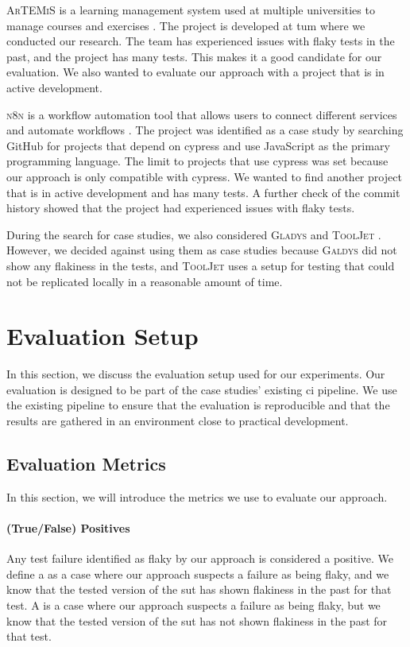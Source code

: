 \textsc{ArTEMiS} is a learning management system used at multiple universities to manage courses and exercises \autocite{krusche_artemis_2018}.
The project is developed at \ac{tum} where we conducted our research.
The team has experienced issues with flaky tests in the past, and the project has many tests.
This makes it a good candidate for our evaluation.
We also wanted to evaluate our approach with a project that is in active development.

\textsc{n8n} is a workflow automation tool that allows users to connect different services and automate workflows \autocite{noauthor_n8n_2023}.
The project was identified as a case study by searching GitHub for projects that depend on cypress and use JavaScript as the primary programming language.
The limit to projects that use cypress was set because our approach is only compatible with cypress.
We wanted to find another project that is in active development and has many tests.
A further check of the commit history showed that the project had experienced issues with flaky tests.

During the search for case studies, we also considered \textsc{Gladys} \autocite{noauthor_gladys_2023} and \textsc{ToolJet} \autocite{noauthor_tooljettooljet_2023}. However, we decided against using them as case studies because \textsc{Galdys} did not show any flakiness in the tests, and \textsc{ToolJet} uses a setup for testing that could not be replicated locally in a reasonable amount of time.

\section{Evaluation Setup}
In this section, we discuss the evaluation setup used for our experiments.
Our evaluation is designed to be part of the case studies' existing \ac{ci} pipeline.
We use the existing pipeline to ensure that the evaluation is reproducible and that the results are gathered in an environment close to practical development.

\subsection{Evaluation Metrics}
In this section, we will introduce the metrics we use to evaluate our approach.

\paragraph{(True/False) Positives} Any test failure identified as flaky by our approach is considered a positive.
We define a  as a case where our approach suspects a failure as being flaky, and we know that the tested version of the \ac{sut} has shown flakiness in the past for that test.
A  is a case where our approach suspects a failure as being flaky, but we know that the tested version of the \ac{sut} has not shown flakiness in the past for that test.

